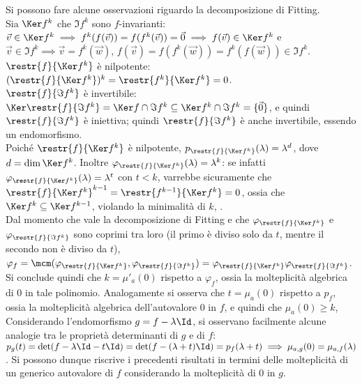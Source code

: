 \documentclass[11pt]{article}
\begin{document}
	\begin{remark} Si possono fare alcune osservazioni riguardo la decomposizione di Fitting. \\

	\li Sia $\Ker f^k$ che $\Im f^k$ sono $f$-invarianti: $\vec v \in \Ker f^k \implies f^k(f(\vec v)) = f(f^k(\vec v)) = \vec0 \implies f(\vec v) \in \Ker f^k$ e $\vec v \in \Im f^k \implies \vec v = f^k(\vec w)$, $f(\vec v) = f(f^k(\vec w)) = f^k(f(\vec w)) \in \Im f^k$. \\ 
	\li $\restr{f}{\Ker f^k}$ è nilpotente: $(\restr{f}{\Ker f^k})^k = \restr{f^k}{\Ker f^k} = 0$. \\
	\li $\restr{f}{\Im f^k}$ è invertibile: $\Ker \restr{f}{\Im f^k} = \Ker f \cap \Im f^k \subseteq \Ker f^k \cap \Im f^k = \{\vec 0\}$, e quindi $\restr{f}{\Im f^k}$ è iniettiva; quindi $\restr{f}{\Im f^k}$ è anche invertibile, essendo un endomorfismo. \\
	\li Poiché $\restr{f}{\Ker f^k}$ è nilpotente, $p_{\restr{f}{\Ker f^k}}(\lambda) = \lambda^d$, dove
	$d = \dim \Ker f^k$. Inoltre
	$\varphi_{\restr{f}{\Ker f^k}}(\lambda) = \lambda^k$: se infatti $\varphi_{\restr{f}{\Ker f^k}}(\lambda) = \lambda^t$
	con $t < k$, varrebbe sicuramente che ${\restr{f}{\Ker f^k}}^{k-1} = \restr{f^{k-1}}{\Ker f^k} = 0$, ossia che
	$\Ker f^k \subseteq \Ker f^{k-1}$, violando la minimalità di $k$, \Lightning. \\
	\li Dal momento che vale la decomposizione di Fitting e che $\varphi_{\restr{f}{\Ker f^k}}$ e $\varphi_{\restr{f}{\Im f^k}}$ sono coprimi tra loro (il primo è diviso solo da $t$, mentre il secondo non è diviso da $t$), $\varphi_f = \mcm(\varphi_{\restr{f}{\Ker f^k}}, \varphi_{\restr{f}{\Im f^k}}) = \varphi_{\restr{f}{\Ker f^k}} \varphi_{\restr{f}{\Im f^k}}$. Si conclude quindi che $k = \mu'_a(0)$ rispetto a $\varphi_f$, ossia la molteplicità algebrica di $0$ in
	tale polinomio. Analogamente si osserva che $t = \mu_a(0)$ rispetto a $p_f$, ossia la molteplicità algebrica
	dell'autovalore $0$ in $f$, e quindi che $\mu_a(0) \geq k$, \\
	\li Considerando l'endomorfismo $g = f - \lambda \Id$, si osservano facilmente alcune analogie tra le proprietà
	determinanti di $g$ e di $f$: $p_g(t) = \det(f - \lambda \Id - t \Id) = \det(f - (\lambda + t) \Id) = p_f(\lambda + t)
	\implies \mu_{a, g}(0) = \mu_{a, f}(\lambda)$. Si possono dunque riscrive i precedenti risultati in termini delle
	molteplicità di un generico autovalore di $f$ considerando la molteplicità di $0$ in $g$.
	\end{remark}
	
\end{document}
